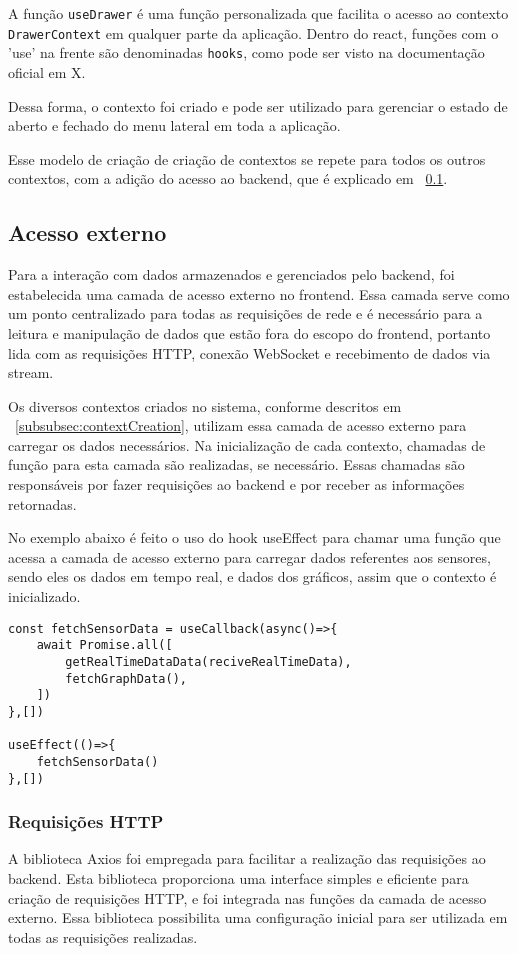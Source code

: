 A função \texttt{useDrawer} é uma função personalizada que facilita o acesso ao contexto \texttt{DrawerContext} em qualquer parte da aplicação. Dentro do react, funções com o 'use' na frente são denominadas \texttt{hooks}, como pode ser visto na documentação oficial em X. %

Dessa forma, o contexto foi criado e pode ser utilizado para gerenciar o estado de aberto e fechado do menu lateral em toda a aplicação.

Esse modelo de criação de criação de contextos se repete para todos os outros contextos, com a adição do acesso ao backend, que é explicado em ~\ref{subsec:api_access}.

\subsection{Acesso externo}\label{subsec:api_access}
Para a interação com dados armazenados e gerenciados pelo backend, foi estabelecida uma camada de acesso externo no frontend. Essa camada serve como um ponto centralizado para todas as requisições de rede e é necessário para a leitura e manipulação de dados que estão fora do escopo do frontend, portanto lida com as requisições HTTP, conexão WebSocket e recebimento de dados via stream.

Os diversos contextos criados no sistema, conforme descritos em ~\ref{subsubsec:contextCreation}, utilizam essa camada de acesso externo para carregar os dados necessários. Na inicialização de cada contexto, chamadas de função para esta camada são realizadas, se necessário. Essas chamadas são responsáveis por fazer requisições ao backend e por receber as informações retornadas.

No exemplo abaixo é feito o uso do hook useEffect para chamar uma função que acessa a camada de acesso externo para carregar dados referentes aos sensores, sendo eles os dados em tempo real, e dados dos gráficos, assim que o contexto é inicializado.%

\begin{verbatim}
const fetchSensorData = useCallback(async()=>{
    await Promise.all([
        getRealTimeDataData(reciveRealTimeData),
        fetchGraphData(),
    ])
},[])

useEffect(()=>{
    fetchSensorData()
},[])
\end{verbatim}


\subsubsection{Requisições HTTP}\label{subsubsec:httpRequest}
A biblioteca Axios foi empregada para facilitar a realização das requisições ao backend. Esta biblioteca proporciona uma interface simples e eficiente para criação de requisições \gls{HTTP}, e foi integrada nas funções da camada de acesso externo. Essa biblioteca possibilita uma configuração inicial para ser utilizada em todas as requisições realizadas.

